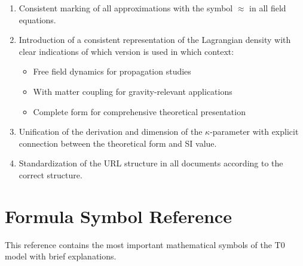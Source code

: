 \documentclass[12pt,a4paper]{article}
\begin{document}
	\begin{enumerate}[label=\textbf{M\arabic*.}]
		\item Consistent marking of all approximations with the symbol $\approx$ in all field equations.
		
		\item Introduction of a consistent representation of the Lagrangian density with clear indications of which version is used in which context:
		\begin{itemize}
			\item Free field dynamics for propagation studies
			\item With matter coupling for gravity-relevant applications
			\item Complete form for comprehensive theoretical presentation
		\end{itemize}
		
		\item Unification of the derivation and dimension of the $\kappa$-parameter with explicit connection between the theoretical form and SI value.
		
		\item Standardization of the URL structure in all documents according to the correct structure.
	\end{enumerate}
	
	\section{Formula Symbol Reference}
	
	\begin{tcolorbox}[colback=blue!5!white,colframe=blue!75!black,title=Mathematical Symbols of the T0 Model]
		This reference contains the most important mathematical symbols of the T0 model with brief explanations.
	\end{tcolorbox}
	
\end{document}
